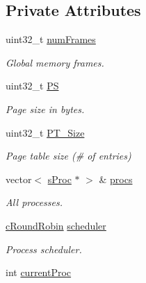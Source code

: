 \subsection*{\-Private \-Attributes}
\begin{DoxyCompactItemize}
\item 
\hypertarget{classcVMM_af1cd736f3e1f6077ef9447a56f88edc9}{uint32\-\_\-t \hyperlink{classcVMM_af1cd736f3e1f6077ef9447a56f88edc9}{num\-Frames}}\label{dc/de5/classcVMM_af1cd736f3e1f6077ef9447a56f88edc9}

\begin{DoxyCompactList}\small\item\em \-Global memory frames. \end{DoxyCompactList}\item 
\hypertarget{classcVMM_ae41d83d7c5bc8a0328f0ec21594e23c9}{uint32\-\_\-t \hyperlink{classcVMM_ae41d83d7c5bc8a0328f0ec21594e23c9}{\-P\-S}}\label{dc/de5/classcVMM_ae41d83d7c5bc8a0328f0ec21594e23c9}

\begin{DoxyCompactList}\small\item\em \-Page size in bytes. \end{DoxyCompactList}\item 
\hypertarget{classcVMM_ae17c1166bc5c01df7e10a3c4db35b5e8}{uint32\-\_\-t \hyperlink{classcVMM_ae17c1166bc5c01df7e10a3c4db35b5e8}{\-P\-T\-\_\-\-Size}}\label{dc/de5/classcVMM_ae17c1166bc5c01df7e10a3c4db35b5e8}

\begin{DoxyCompactList}\small\item\em \-Page table size (\# of entries) \end{DoxyCompactList}\item 
vector$<$ \hyperlink{structsProc}{s\-Proc} $\ast$ $>$ \& \hyperlink{classcVMM_aff53240e056433014fa0a9f7ab71cf26}{procs}
\begin{DoxyCompactList}\small\item\em \-All processes. \end{DoxyCompactList}\item 
\hypertarget{classcVMM_a46455d68dfba303ecba3a13b15376cfe}{\hyperlink{classcRoundRobin}{c\-Round\-Robin} \hyperlink{classcVMM_a46455d68dfba303ecba3a13b15376cfe}{scheduler}}\label{dc/de5/classcVMM_a46455d68dfba303ecba3a13b15376cfe}

\begin{DoxyCompactList}\small\item\em \-Process scheduler. \end{DoxyCompactList}\item 
\hypertarget{classcVMM_aa03d64942a7a89e1ffc2e4ea0b995374}{int \hyperlink{classcVMM_aa03d64942a7a89e1ffc2e4ea0b995374}{current\-Proc}}\label{dc/de5/classcVMM_aa03d64942a7a89e1ffc2e4ea0b995374}


\end{DoxyCompactItemize}
